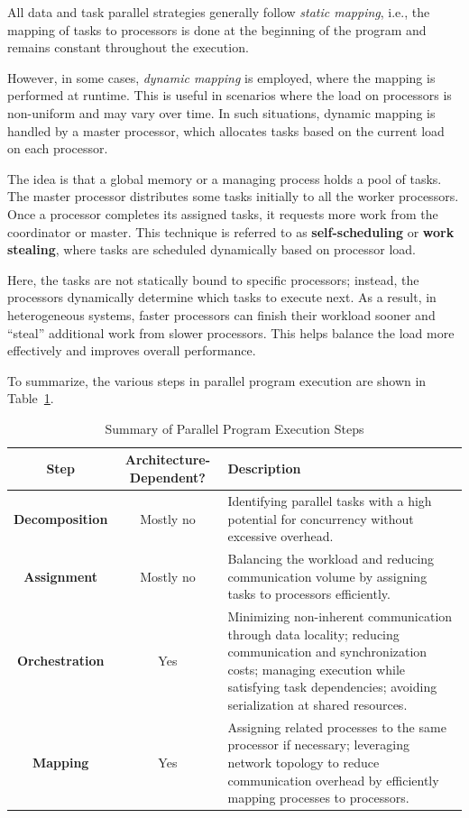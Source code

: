 \documentclass[12pt]{book}
\begin{document}
All data and task parallel strategies generally follow \textit{static mapping}, i.e., the mapping of tasks to processors is done at the beginning of the program and remains constant throughout the execution. 

However, in some cases, \textit{dynamic mapping} is employed, where the mapping is performed at runtime. This is useful in scenarios where the load on processors is non-uniform and may vary over time. In such situations, dynamic mapping is handled by a master processor, which allocates tasks based on the current load on each processor.

The idea is that a global memory or a managing process holds a pool of tasks. The master processor distributes some tasks initially to all the worker processors. Once a processor completes its assigned tasks, it requests more work from the coordinator or master. This technique is referred to as \textbf{self-scheduling} or \textbf{work stealing}, where tasks are scheduled dynamically based on processor load. 

Here, the tasks are not statically bound to specific processors; instead, the processors dynamically determine which tasks to execute next. As a result, in heterogeneous systems, faster processors can finish their workload sooner and ``steal'' additional work from slower processors. This helps balance the load more effectively and improves overall performance.

To summarize, the various steps in parallel program execution are shown in Table~\ref{tab:summary}.

\begin{table}[H]
    \centering
    \renewcommand{\arraystretch}{1.4}
    \begin{tabular}{|c|c|p{}|}
        \hline
        \textbf{Step} & \textbf{Architecture-Dependent?} & \textbf{Description} \\
        \hline
        \textbf{Decomposition} & Mostly no & Identifying parallel tasks with a high potential for concurrency without excessive overhead. \\
        \hline
        \textbf{Assignment} & Mostly no & Balancing the workload and reducing communication volume by assigning tasks to processors efficiently. \\
        \hline
        \textbf{Orchestration} & Yes & Minimizing non-inherent communication through data locality; reducing communication and synchronization costs; managing execution while satisfying task dependencies; avoiding serialization at shared resources. \\
        \hline
        \textbf{Mapping} & Yes & Assigning related processes to the same processor if necessary; leveraging network topology to reduce communication overhead by efficiently mapping processes to processors. \\
        \hline
    \end{tabular}
    \caption{Summary of Parallel Program Execution Steps}
    \label{tab:summary}
\end{table}
\end{document}
